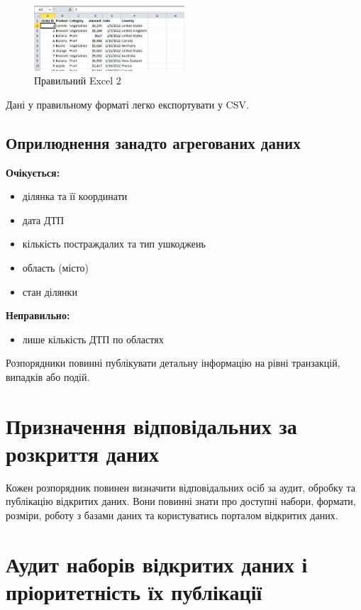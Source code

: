 \begin{figure}[h]
    \centering
    \includegraphics[width=0.5\textwidth]{images/007.jpg}
    \caption{Правильний Excel 2}
\end{figure}

Дані у правильному форматі легко експортувати у CSV.

\subsection{Оприлюднення занадто агрегованих даних}

\textbf{Очікується:}  
\begin{itemize}
    \item ділянка та її координати  
    \item дата ДТП  
    \item кількість постраждалих та тип ушкоджень  
    \item область (місто)  
    \item стан ділянки
\end{itemize}

\textbf{Неправильно:}  
\begin{itemize}
    \item лише кількість ДТП по областях
\end{itemize}

Розпорядники повинні публікувати детальну інформацію на рівні транзакцій, випадків або подій.

\section{Призначення відповідальних за розкриття даних}

Кожен розпорядник повинен визначити відповідальних осіб за аудит, обробку та публікацію відкритих даних. Вони повинні знати про доступні набори, формати, розміри, роботу з базами даних та користуватись порталом відкритих даних.

\section{Аудит наборів відкритих даних і пріоритетність їх публікації}

